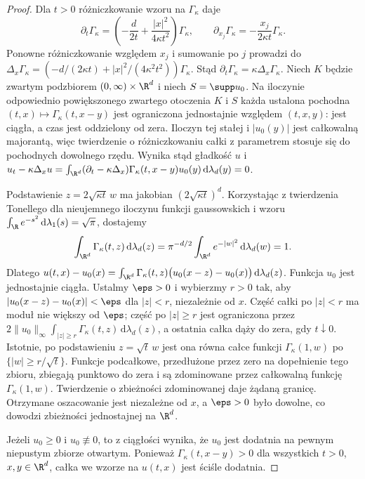 \begin{proof}
Dla $t>0$ różniczkowanie wzoru na $\Gamma_\kappa$ daje
\[
 \partial_t\Gamma_\kappa=
 \left(-\frac d{2t}+\frac{|x|^2}{4\kappa t^2}\right)\Gamma_\kappa,
 \qquad
 \partial_{x_j}\Gamma_\kappa=-\frac{x_j}{2\kappa t}\Gamma_\kappa.
\]
Ponowne różniczkowanie względem $x_j$ i sumowanie po $j$
prowadzi do
$\Delta_x\Gamma_\kappa=
(-d/(2\kappa t)+|x|^2/(4\kappa^2t^2))\Gamma_\kappa$.
Stąd $\partial_t\Gamma_\kappa=\kappa\Delta_x\Gamma_\kappa$.
Niech $K$ będzie zwartym podzbiorem $(0,\infty)\times\R^d$
i niech $S=\supp u_0$. Na iloczynie odpowiednio powiększonego
zwartego otoczenia $K$ i $S$ każda ustalona pochodna
$(t,x)\mapsto\Gamma_\kappa(t,x-y)$ jest ograniczona
jednostajnie względem $(t,x,y)$: jest ciągła, a czas jest
oddzielony od zera. Iloczyn tej stałej i $|u_0(y)|$ jest
całkowalną majorantą, więc twierdzenie o różniczkowaniu całki
z parametrem stosuje się do pochodnych dowolnego rzędu.
Wynika stąd gładkość $u$ i
$u_t-\kappa\Delta_xu=\int_{\R^d}(\partial_t-\kappa\Delta_x)
\Gamma_\kappa(t,x-y)u_0(y)\,\mathrm d\lambda_d(y)=0$.

Podstawienie $z=2\sqrt{\kappa t}\,w$ ma jakobian
$(2\sqrt{\kappa t})^d$. Korzystając z twierdzenia Tonellego
dla nieujemnego iloczynu funkcji gaussowskich i wzoru
$\int_{\R}e^{-s^2}\,\mathrm d\lambda_1(s)=\sqrt\pi$, dostajemy
\[
 \int_{\R^d}\Gamma_\kappa(t,z)\,\mathrm d\lambda_d(z)
 =\pi^{-d/2}\int_{\R^d}e^{-|w|^2}\,\mathrm d\lambda_d(w)=1.
\]
Dlatego
$u(t,x)-u_0(x)=\int_{\R^d}\Gamma_\kappa(t,z)
\bigl(u_0(x-z)-u_0(x)\bigr)\,\mathrm d\lambda_d(z)$.
Funkcja $u_0$ jest jednostajnie ciągła. Ustalmy $\eps>0$
i wybierzmy $r>0$ tak, aby
$|u_0(x-z)-u_0(x)|<\eps$ dla $|z|<r$, niezależnie od $x$.
Część całki po $|z|<r$ ma moduł nie większy od $\eps$;
część po $|z|\geq r$ jest ograniczona przez
$2\|u_0\|_\infty\int_{|z|\geq r}\Gamma_\kappa(t,z)
\,\mathrm d\lambda_d(z)$, a ostatnia całka dąży do zera,
gdy $t\downarrow0$. Istotnie, po podstawieniu $z=\sqrt t\,w$
jest ona równa całce funkcji $\Gamma_\kappa(1,w)$ po
$\{|w|\geq r/\sqrt t\}$. Funkcje podcałkowe, przedłużone
przez zero na dopełnienie tego zbioru, zbiegają punktowo
do zera i są zdominowane przez całkowalną funkcję
$\Gamma_\kappa(1,w)$. Twierdzenie o zbieżności zdominowanej
daje żądaną granicę. Otrzymane oszacowanie jest niezależne
od $x$, a $\eps>0$ było dowolne, co dowodzi zbieżności
jednostajnej na $\R^d$.

Jeżeli $u_0\geq0$ i $u_0\not\equiv0$, to z ciągłości
wynika, że $u_0$ jest dodatnia na pewnym niepustym zbiorze
otwartym. Ponieważ $\Gamma_\kappa(t,x-y)>0$ dla wszystkich
$t>0$, $x,y\in\R^d$, całka we wzorze na $u(t,x)$
jest ściśle dodatnia.
\end{proof}

